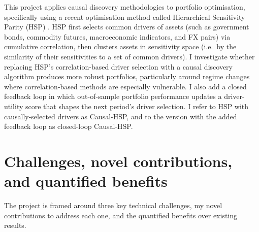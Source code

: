 \documentclass[12pt, a4paper]{report}
\begin{document}
This project applies causal discovery methodologies to portfolio optimisation, specifically using a recent optimisation method called Hierarchical Sensitivity Parity (HSP) \cite{rodriguez2023hsp}.
HSP first selects common drivers of assets (such as government bonds, commodity futures, macroeconomic indicators, and FX pairs) via cumulative correlation,
then clusters assets in sensitivity space (i.e.~by the similarity of their sensitivities to a set of common drivers).
I investigate whether replacing HSP's correlation-based driver selection with a causal discovery algorithm
produces more robust portfolios, particularly around regime changes where
correlation-based methods are especially vulnerable. 
I also add a closed feedback loop in which
out-of-sample portfolio performance updates a driver-utility score that shapes the next period's driver selection.
I refer to HSP with causally-selected drivers as Causal-HSP, and to the version with the added
feedback loop as closed-loop Causal-HSP.

\section{Challenges, novel contributions, and quantified benefits}
\label{sec:challenges}

The project is framed around three key technical challenges, my novel contributions to address each one, and the quantified benefits over existing results.
\end{document}

